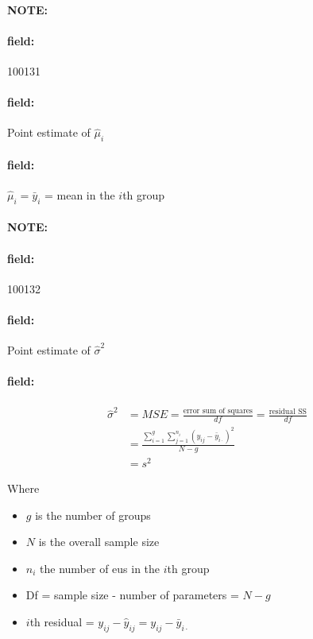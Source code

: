 \documentclass[12pt]{article}
\newenvironment{note}{\paragraph{NOTE:}}{}
\newenvironment{field}{\paragraph{field:}}{}
\begin{document}
\begin{note}
 \begin{field}
  \tiny 100131
 \end{field}
 \begin{field}
  Point estimate of $\hat{\mu}_i$
 \end{field}
 \begin{field}
  $\hat{\mu}_i = \bar{y}_i$ = mean in the $i$th group
 \end{field}
\end{note}

\begin{note}
 \begin{field}
  \tiny 100132
 \end{field}
 \begin{field}
  Point estimate of
  $\hat{\sigma}^2$
 \end{field}
 \begin{field}
  \begin{align}
   \hat{\sigma}^2 & = MSE = \frac{\text{error sum of squares}}{df} = \frac{\text{residual SS}}{df} \\
                  & = \frac{\sum_{i=1}^g \sum_{j=1}^{n_i}(y_{ij} - \bar{y}_{i\cdot})^2}{N-g}       \\
                  & = s^2
  \end{align}

  Where
  \begin{itemize}
   \item $g$ is the number of groups
   \item $N$ is the overall sample size
   \item $n_i$ the number of eus in the $i$th group
   \item Df = sample size - number of parameters = $N-g$
   \item $i$th residual = $y_{ij} - \hat{y}_{ij} = y_{ij} - \bar{y}_{i\cdot }$
  \end{itemize}
 \end{field}
\end{note}
\end{document}
